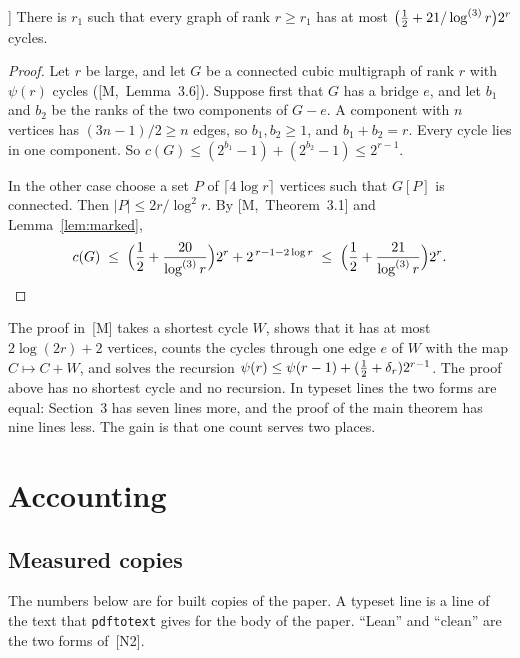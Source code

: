 \documentclass[11pt]{article}
\newcommand{\M}[1]{[M,~#1]}
\begin{document}
\begin{corollary}[Leading term; \M{Corollary~3.7}]\label{cor:cycles}
There is $r_1$ such that every graph of rank $r\ge r_1$ has at most
$\bigl(\tfrac12+21/\log^{(3)}r\bigr)2^{r}$ cycles.
\end{corollary}

\begin{proof}
Let $r$ be large, and let $G$ be a connected cubic multigraph of rank $r$ with $\psi(r)$ cycles
(\M{Lemma~3.6}). Suppose first that $G$ has a bridge $e$, and let $b_1$ and $b_2$ be the ranks of
the two components of $G-e$. A component with $n$ vertices has $(3n-1)/2\ge n$ edges, so
$b_1,b_2\ge1$, and $b_1+b_2=r$. Every cycle lies in one component. So
$c(G)\le(2^{b_1}-1)+(2^{b_2}-1)\le2^{r-1}$.

In the other case choose a set $P$ of $\lceil4\log r\rceil$ vertices such that $G[P]$ is
connected. Then $|P|\le2r/\log^{2}r$. By \M{Theorem~3.1} and Lemma~\ref{lem:marked},
\[
  c(G)\;\le\;\Bigl(\frac12+\frac{20}{\log^{(3)}r}\Bigr)2^{r}+2^{\,r-1-2\log r}
  \;\le\;\Bigl(\frac12+\frac{21}{\log^{(3)}r}\Bigr)2^{r}.\qedhere
\]
\end{proof}

The proof in~[M] takes a shortest cycle $W$, shows that it has at most $2\log(2r)+2$ vertices,
counts the cycles through one edge $e$ of $W$ with the map $C\mapsto C+W$, and solves the
recursion $\psi(r)\le\psi(r-1)+(\tfrac12+\delta_r)2^{r-1}$. The proof above has no shortest cycle
and no recursion. In typeset lines the two forms are equal: Section~3 has seven lines more, and
the proof of the main theorem has nine lines less. The gain is that one count serves two
places.

\section{Accounting}\label{sec:accounting}

\subsection{Measured copies}

The numbers below are for built copies of the paper. A typeset line is a line of the text that
\texttt{pdftotext} gives for the body of the paper. ``Lean'' and ``clean'' are the two forms
of~[N2].
\end{document}

